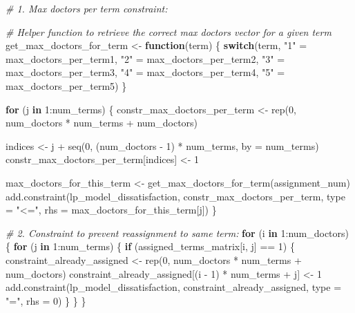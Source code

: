 \documentclass[
]{article}
\newenvironment{Shaded}{\begin{snugshade}}{\end{snugshade}}
\newcommand{\AttributeTok}[1]{\textcolor[rgb]{0.77,0.63,0.00}{#1}}
\newcommand{\CommentTok}[1]{\textcolor[rgb]{0.56,0.35,0.01}{\textit{#1}}}
\newcommand{\ControlFlowTok}[1]{\textcolor[rgb]{0.13,0.29,0.53}{\textbf{#1}}}
\newcommand{\DecValTok}[1]{\textcolor[rgb]{0.00,0.00,0.81}{#1}}
\newcommand{\FunctionTok}[1]{\textcolor[rgb]{0.00,0.00,0.00}{#1}}
\newcommand{\NormalTok}[1]{#1}
\newcommand{\OtherTok}[1]{\textcolor[rgb]{0.56,0.35,0.01}{#1}}
\newcommand{\SpecialCharTok}[1]{\textcolor[rgb]{0.00,0.00,0.00}{#1}}
\newcommand{\StringTok}[1]{\textcolor[rgb]{0.31,0.60,0.02}{#1}}
\begin{document}
\begin{Shaded}
\begin{Highlighting}[]
\CommentTok{\# 1. Max doctors per term constraint:}

\CommentTok{\# Helper function to retrieve the correct \textquotesingle{}max doctors\textquotesingle{} vector for a given term}
\NormalTok{   get\_max\_doctors\_for\_term }\OtherTok{\textless{}{-}} \ControlFlowTok{function}\NormalTok{(term) \{}
     \ControlFlowTok{switch}\NormalTok{(term,}
            \StringTok{"1"} \OtherTok{=}\NormalTok{ max\_doctors\_per\_term1,}
            \StringTok{"2"} \OtherTok{=}\NormalTok{ max\_doctors\_per\_term2,}
            \StringTok{"3"} \OtherTok{=}\NormalTok{ max\_doctors\_per\_term3,}
            \StringTok{"4"} \OtherTok{=}\NormalTok{ max\_doctors\_per\_term4,}
            \StringTok{"5"} \OtherTok{=}\NormalTok{ max\_doctors\_per\_term5)}
\NormalTok{   \}}


\ControlFlowTok{for}\NormalTok{ (j }\ControlFlowTok{in} \DecValTok{1}\SpecialCharTok{:}\NormalTok{num\_terms) \{}
\NormalTok{  constr\_max\_doctors\_per\_term }\OtherTok{\textless{}{-}} \FunctionTok{rep}\NormalTok{(}\DecValTok{0}\NormalTok{, num\_doctors }\SpecialCharTok{*}\NormalTok{ num\_terms }\SpecialCharTok{+}\NormalTok{ num\_doctors)}
  
\NormalTok{  indices }\OtherTok{\textless{}{-}}\NormalTok{ j }\SpecialCharTok{+} \FunctionTok{seq}\NormalTok{(}\DecValTok{0}\NormalTok{, (num\_doctors }\SpecialCharTok{{-}} \DecValTok{1}\NormalTok{) }\SpecialCharTok{*}\NormalTok{ num\_terms, }\AttributeTok{by =}\NormalTok{ num\_terms)}
\NormalTok{  constr\_max\_doctors\_per\_term[indices] }\OtherTok{\textless{}{-}} \DecValTok{1}
  
\NormalTok{  max\_doctors\_for\_this\_term }\OtherTok{\textless{}{-}} \FunctionTok{get\_max\_doctors\_for\_term}\NormalTok{(assignment\_num)}
  \FunctionTok{add.constraint}\NormalTok{(lp\_model\_dissatisfaction, constr\_max\_doctors\_per\_term, }\AttributeTok{type =} \StringTok{"\textless{}="}\NormalTok{, }\AttributeTok{rhs =}\NormalTok{ max\_doctors\_for\_this\_term[j])}
\NormalTok{\}}

\CommentTok{\# 2. Constraint to prevent reassignment to same term:}
\ControlFlowTok{for}\NormalTok{ (i }\ControlFlowTok{in} \DecValTok{1}\SpecialCharTok{:}\NormalTok{num\_doctors) \{}
  \ControlFlowTok{for}\NormalTok{ (j }\ControlFlowTok{in} \DecValTok{1}\SpecialCharTok{:}\NormalTok{num\_terms) \{}
    \ControlFlowTok{if}\NormalTok{ (assigned\_terms\_matrix[i, j] }\SpecialCharTok{==} \DecValTok{1}\NormalTok{) \{}
\NormalTok{      constraint\_already\_assigned }\OtherTok{\textless{}{-}} \FunctionTok{rep}\NormalTok{(}\DecValTok{0}\NormalTok{, num\_doctors }\SpecialCharTok{*}\NormalTok{ num\_terms }\SpecialCharTok{+}\NormalTok{ num\_doctors)}
\NormalTok{      constraint\_already\_assigned[(i }\SpecialCharTok{{-}} \DecValTok{1}\NormalTok{) }\SpecialCharTok{*}\NormalTok{ num\_terms }\SpecialCharTok{+}\NormalTok{ j] }\OtherTok{\textless{}{-}} \DecValTok{1}
      \FunctionTok{add.constraint}\NormalTok{(lp\_model\_dissatisfaction, constraint\_already\_assigned, }\AttributeTok{type =} \StringTok{"="}\NormalTok{, }\AttributeTok{rhs =} \DecValTok{0}\NormalTok{)}
\NormalTok{    \}}
\NormalTok{  \}}
\NormalTok{\}}


\end{Highlighting}
\end{Shaded}
\end{document}
